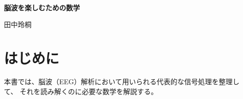 \documentclass[a4paper,12pt]{ltjsbook}
\begin{document}
\begin{titlepage}
\centering

\vspace*{6cm}

{\Huge \bfseries 脳波を楽しむための数学 \par}

\vspace{2cm}

{\Large 田中玲桐 \par}

\vfill

\end{titlepage}

\chapter*{はじめに}

本書では、脳波（EEG）解析において用いられる代表的な信号処理を整理して、
それを読み解くのに必要な数学を解説する。

\clearpage

\tableofcontents






\end{document}
